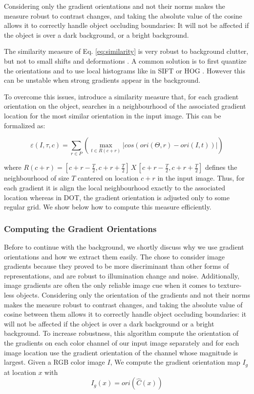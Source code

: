 Considering only the gradient orientations and not their norms makes the measure
robust to contrast changes, and taking the absolute value of the cosine allows it
to correctly handle object occluding boundaries: It will not be affected if the object 
is over a dark background, or a bright background.

The similarity measure of Eq. \ref{eq:similarity} is very robust to background clutter,
but not to small shifts and deformations . A common solution is to first
quantize the orientations and to use local histograms like in SIFT \citet{Lowe2004} 
or HOG \citet{Dalal2005}. However this can be unstable when strong gradients appear 
in the background.

To overcome this issues, \citet{Hinterstoisser2011} introduce a similarity measure
that, for each gradient orientation on the object, searches in a neighbourhood of
the associated gradient location for the most similar orientation in the input image.
This can be formalized as:


\begin{equation}
\label{eq:newsimilarity}
\varepsilon(I, \tau, c) = \sum_{r \in P}\left( \max\limits_{t \in R(c+r)}\left|cos(ori(\Theta,r) - ori(I,t))\right|\right)
\end{equation}

where $R(c+r)=[c+r-\frac{T}{2}, c+r+\frac{T}{2}]\,X\,[c+r-\frac{T}{2}, c+r+\frac{T}{2}]$
defines the neighbourhood of size $T$ cantered on location $c+r$ in the input image.
Thus, for each gradient it is align the local neighbourhood exactly to the associated 
location whereas in DOT, the gradient orientation is adjusted only to some regular grid. 
We show below how to compute this measure efficiently.

\subsubsection{Computing the Gradient Orientations}
Before to continue with the background, we shortly discuss why we use gradient orientations 
and how we extract them easily.
The chose to consider image gradients because they proved to be more discriminant than
other forms of representations, and are robust to illumination change and noise. Additionally,
 image gradients are often the only reliable image cue when it comes to 
texture-less objects. Considering only the orientation of the gradients and not their
norms makes the measure robust to contrast changes, and taking the absolute value of
cosine between them allows it to correctly handle object occluding boundaries: it will 
not be affected if the object is over a dark background or a bright background.
To increase robustness, this algorithm compute the orientation of the gradients on
each color channel of our input image separately and for each image location use the 
gradient orientation of the channel whose magnitude is largest. Given a RGB color image $I$, 
We compute the gradient orientation map $I_g$ at location $x$ with
\begin{equation}
I_g(x)=ori(\hat{C}(x))
\end{equation}

